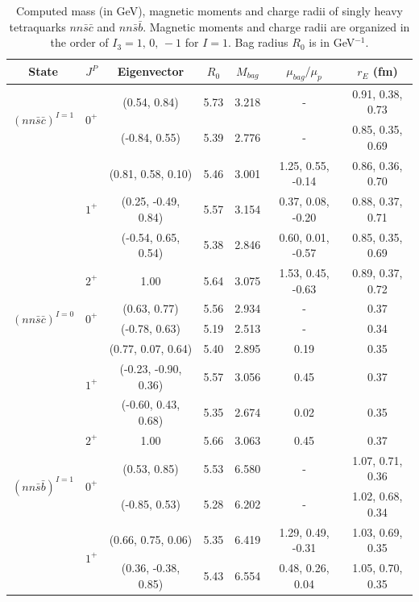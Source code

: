 \documentclass[12pt,prd,onecolumn,floatfix,nofootinbib]{revtex4}
\begin{document}
\renewcommand{\tabcolsep}{0.37cm} \renewcommand{\arraystretch}{1.1}
\begin{table}[!htb]
\caption{Computed mass (in GeV), magnetic moments and charge radii of singly
heavy tetraquarks $nn\bar{s}\bar{c}$ and $nn\bar{s}\bar{b}$. Magnetic
moments and charge radii are organized in the order of $I_{3}=1,\,0,\,-1$
for $I=1$. Bag radius $R_{0}$ is in GeV$^{-1}$. }
\label{tab:1heavytetraquark}%
\begin{tabular}{ccccccc}
\hline\hline
\textrm{State} & $J^{P}$ & \textrm{Eigenvector} & $R_{0}$ & $M_{bag}$ & $%
\mu_{bag}/\mu_{p}$ & $r_{E}$ (fm) \\ \hline
\multirow{2}{*}{${(nn\bar{s}\bar{c})}^{I=1}$} & \multirow{2}{*}{$0^{+}$} &
(0.54, 0.84) & 5.73 & 3.218 & - & 0.91, 0.38, 0.73 \\
&  & (-0.84, 0.55) & 5.39 & 2.776 & - & 0.85, 0.35, 0.69 \\
& \multirow{3}{*}{$1^{+}$} & (0.81, 0.58, 0.10) & 5.46 & 3.001 & 1.25, 0.55,
-0.14 & 0.86, 0.36, 0.70 \\
&  & (0.25, -0.49, 0.84) & 5.57 & 3.154 & 0.37, 0.08, -0.20 & 0.88, 0.37,
0.71 \\
&  & (-0.54, 0.65, 0.54) & 5.38 & 2.846 & 0.60, 0.01, -0.57 & 0.85, 0.35,
0.69 \\
& $2^{+}$ & 1.00 & 5.64 & 3.075 & 1.53, 0.45, -0.63 & 0.89, 0.37, 0.72 \\
\multirow{2}{*}{${(nn\bar{s}\bar{c})}^{I=0}$} & \multirow{2}{*}{$0^{+}$} &
(0.63, 0.77) & 5.56 & 2.934 & - & 0.37 \\
&  & (-0.78, 0.63) & 5.19 & 2.513 & - & 0.34 \\
& \multirow{3}{*}{$1^{+}$} & (0.77, 0.07, 0.64) & 5.40 & 2.895 & 0.19 & 0.35
\\
&  & (-0.23, -0.90, 0.36) & 5.57 & 3.056 & 0.45 & 0.37 \\
&  & (-0.60, 0.43, 0.68) & 5.35 & 2.674 & 0.02 & 0.35 \\
& $2^{+}$ & 1.00 & 5.66 & 3.063 & 0.45 & 0.37 \\
\multirow{2}{*}{${(nn\bar{s}\bar{b})}^{I=1}$} & \multirow{2}{*}{$0^{+}$} &
(0.53, 0.85) & 5.53 & 6.580 & - & 1.07, 0.71, 0.36 \\
&  & (-0.85, 0.53) & 5.28 & 6.202 & - & 1.02, 0.68, 0.34 \\
& \multirow{3}{*}{$1^{+}$} & (0.66, 0.75, 0.06) & 5.35 & 6.419 & 1.29, 0.49,
-0.31 & 1.03, 0.69, 0.35 \\
&  & (0.36, -0.38, 0.85) & 5.43 & 6.554 & 0.48, 0.26, 0.04 & 1.05, 0.70, 0.35
\\

\end{tabular}
\end{table}
\end{document}
